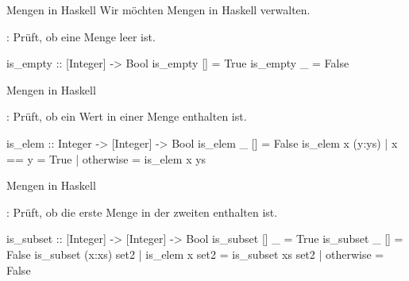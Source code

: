 \begin{frame}[fragile]{Mengen in Haskell}\onslide<+->%
    Wir möchten Mengen in Haskell verwalten.

    \onslide<+->
    
    \onslide<+->\begin{exercise}[a)]
    : Prüft, ob eine Menge leer ist.
    \end{exercise}
    \onslide<+->\begin{solve}[a)]
    \begin{plainhaskell}
is_empty :: [Integer] -> Bool
is_empty [] = True
is_empty _ = False
    \end{plainhaskell}
    \end{solve}
\end{frame}
\resetframecounters
\begin{frame}[fragile]{Mengen in Haskell}\onslide<+->%
    \begin{exercise}[b)]
        : Prüft, ob ein Wert in einer Menge enthalten ist.
        \end{exercise}
        \onslide<+->\begin{solve}[b)]
        \begin{plainhaskell}
is_elem :: Integer -> [Integer] -> Bool
is_elem _ [] = False
is_elem x (y:ys)
    | x == y = True
    | otherwise = is_elem x ys
        \end{plainhaskell}
        \end{solve}
\end{frame}
\resetframecounters
\begin{frame}[fragile]{Mengen in Haskell}\onslide<+->%
    \begin{exercise}[c)]
        : Prüft, ob die erste Menge in der zweiten enthalten ist.
        \end{exercise}
        \onslide<+->\begin{solve}[c)]
        \begin{plainhaskell}
is_subset :: [Integer] -> [Integer] -> Bool
is_subset [] _ = True
is_subset _ [] = False
is_subset (x:xs) set2
    | is_elem x set2 = is_subset xs set2
    | otherwise = False
        \end{plainhaskell}
        \end{solve}
\end{frame}
